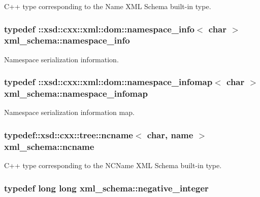 C++ type corresponding to the Name X\-M\-L Schema built-\/in type. 

\hypertarget{namespacexml__schema_a21061cbf10bfd5a1c98489f10429786e}{
\subsubsection[{namespace\-\_\-info}]{\setlength{\rightskip}{0pt plus 5cm}typedef \-::xsd\-::cxx\-::xml\-::dom\-::namespace\-\_\-info$<$ char $>$ {\bf xml\-\_\-schema\-::namespace\-\_\-info}}}\label{namespacexml__schema_a21061cbf10bfd5a1c98489f10429786e}


Namespace serialization information. 

\hypertarget{namespacexml__schema_ad52b6e3505153cb30ba3452f7868450e}{
\subsubsection[{namespace\-\_\-infomap}]{\setlength{\rightskip}{0pt plus 5cm}typedef \-::xsd\-::cxx\-::xml\-::dom\-::namespace\-\_\-infomap$<$ char $>$ {\bf xml\-\_\-schema\-::namespace\-\_\-infomap}}}\label{namespacexml__schema_ad52b6e3505153cb30ba3452f7868450e}


Namespace serialization information map. 

\hypertarget{namespacexml__schema_adb64d7469eb27804ae649fbaccba54d6}{
\subsubsection[{ncname}]{\setlength{\rightskip}{0pt plus 5cm}typedef\-::xsd\-::cxx\-::tree\-::ncname$<$ char, {\bf name} $>$ {\bf xml\-\_\-schema\-::ncname}}}\label{namespacexml__schema_adb64d7469eb27804ae649fbaccba54d6}


C++ type corresponding to the N\-C\-Name X\-M\-L Schema built-\/in type. 

\hypertarget{namespacexml__schema_acf9528a84381d07f2802785c947bf441}{
\subsubsection[{negative\-\_\-integer}]{\setlength{\rightskip}{0pt plus 5cm}typedef long long {\bf xml\-\_\-schema\-::negative\-\_\-integer}}}\label{namespacexml__schema_acf9528a84381d07f2802785c947bf441}


